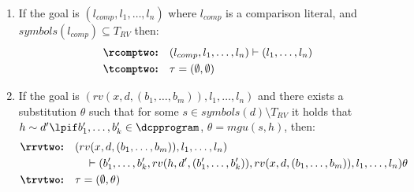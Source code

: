 \begin{definition}
\begin{enumerate}
		\item[\bf \ccomptwo]  If the goal is $( l_{comp}, l_1, \dots, l_n )$  where $l_{comp}$ is a comparison literal, and   $symbols(l_{comp})\subseteq T_{RV}$ then:
		\begin{align*}
			&{\text{\bf \rcomptwo:}} \quad  ( l_{comp}, l_1, \dots, l_n ) \vdash  (l_1, \dots, l_n )
			\\
			&{\text{\bf \tcomptwo:}} \quad \tau = (\emptyset, \emptyset)
		\end{align*}
		
		\item[\bf \crvtwo]  If the goal is $(rv(x, d, (b_1, \dots, b_{m})), l_1,\dots, l_n)$ and  there exists a substitution $\theta$ such that for some $s \in symbols(d)\setminus T_{RV}$ it holds that $h\sim d' \lpif b'_1, \dots, b'_{k}\in \dcpprogram$, $\theta = mgu(s,h)$, then:
		\begin{align*}
			{\text{\bf \rrvtwo:}} \quad 
			&(rv(x, d, (b_1, \dots, b_{m})), l_1, \dots, l_n) \\
			&~~~\vdash (b'_1, \dots, b'_{k}, rv(h, d', (b'_1, \dots, b'_{k})), rv(x, d, (b_1, \dots, b_{m})), l_1, \dots, l_n)\theta
			\\
			{\text{\bf \trvtwo:}} \quad &\tau =  (\emptyset, \theta)
		\end{align*}
		

\end{enumerate}
\end{definition}
